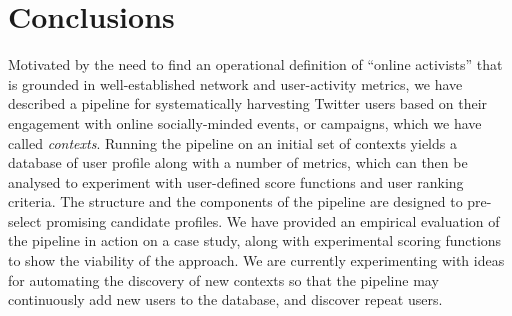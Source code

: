 \section{Conclusions}

Motivated by the need to find an operational definition of ``online activists'' that is grounded in well-established network and user-activity metrics, we have described a pipeline for systematically harvesting Twitter users based on their engagement with online socially-minded events, or campaigns, which we have called \textit{contexts}.
Running the pipeline on an initial set of contexts yields a database of user profile along with a number of metrics, which can then be analysed to experiment with user-defined score functions and user ranking criteria. The structure and the components of the pipeline are designed to pre-select promising candidate profiles. 
We have provided an empirical evaluation of the pipeline in action on a case study, along with experimental scoring functions to show the viability of the approach. 
We are currently experimenting with ideas for automating the discovery of new contexts so that the pipeline may continuously add new users to the database, and discover repeat users.